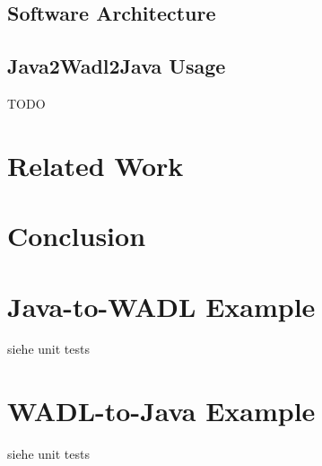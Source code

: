 \documentclass[a4paper,12pt]{article}
\begin{document}
\subsection{Software Architecture}


\subsection{Java2Wadl2Java Usage}
TODO

\section{Related Work}


\section{Conclusion}


\newpage

\appendix

\section{Java-to-WADL Example}

siehe unit tests

\section{WADL-to-Java Example}

siehe unit tests

\newpage


\end{document}
